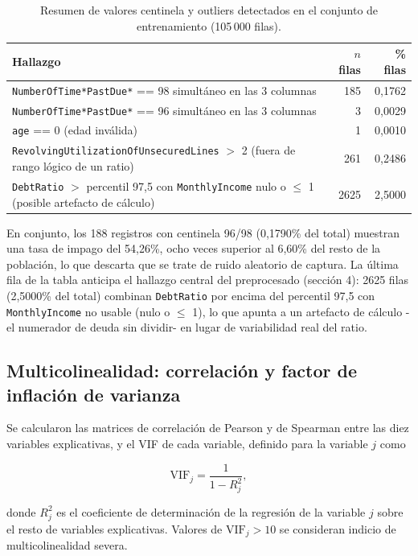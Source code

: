 \documentclass[11pt,a4paper]{article}
\begin{document}
\begin{table}[H]
\centering
\caption{Resumen de valores centinela y outliers detectados en el conjunto de entrenamiento (105\,000 filas).}
\label{tab:centinelas_outliers}
\begin{tabular}{p{8.2cm}rr}
\toprule
Hallazgo & $n$ filas & \% filas \\
\midrule
\texttt{NumberOfTime*PastDue*} == 98 simult\'aneo en las 3 columnas & 185 & 0,1762 \\
\texttt{NumberOfTime*PastDue*} == 96 simult\'aneo en las 3 columnas & 3 & 0,0029 \\
\texttt{age} == 0 (edad inv\'alida) & 1 & 0,0010 \\
\texttt{RevolvingUtilizationOfUnsecuredLines} $>$ 2 (fuera de rango l\'ogico de un ratio) & 261 & 0,2486 \\
\texttt{DebtRatio} $>$ percentil 97,5 con \texttt{MonthlyIncome} nulo o $\leq$ 1 (posible artefacto de c\'alculo) & 2625 & 2,5000 \\
\bottomrule
\end{tabular}
\end{table}

En conjunto, los 188 registros con centinela 96/98 (0,1790\% del total) muestran una tasa de impago del 54,26\%, ocho veces superior al 6,60\% del resto de la poblaci\'on, lo que descarta que se trate de ruido aleatorio de captura. La \'ultima fila de la tabla anticipa el hallazgo central del preprocesado (secci\'on 4): 2625 filas (2,5000\% del total) combinan \texttt{DebtRatio} por encima del percentil 97,5 con \texttt{MonthlyIncome} no usable (nulo o $\leq$ 1), lo que apunta a un artefacto de c\'alculo -el numerador de deuda sin dividir- en lugar de variabilidad real del ratio.

\subsection{Multicolinealidad: correlaci\'on y factor de inflaci\'on de varianza}

Se calcularon las matrices de correlaci\'on de Pearson y de Spearman entre las diez variables explicativas, y el VIF de cada variable, definido para la variable $j$ como

\[
\mathrm{VIF}_j = \frac{1}{1 - R_j^2},
\]

donde $R_j^2$ es el coeficiente de determinaci\'on de la regresi\'on de la variable $j$ sobre el resto de variables explicativas. Valores de $\mathrm{VIF}_j > 10$ se consideran indicio de multicolinealidad severa.
\end{document}
